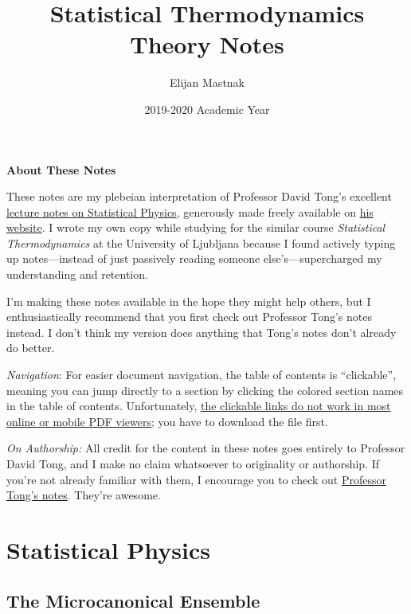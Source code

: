 \documentclass[11pt, a4paper]{article}
\begin{document}
\title{Statistical Thermodynamics Theory Notes}
\author{Elijan Mastnak}
\date{2019-2020 Academic Year}
\maketitle

\begin{center}
\textbf{About These Notes}
\end{center}
These notes are my plebeian interpretation of Professor David Tong's excellent \href{http://www.damtp.cam.ac.uk/user/tong/statphys.html}{lecture notes on Statistical Physics}, generously made freely available on \href{http://www.damtp.cam.ac.uk/user/tong/teaching.html}{his website}. I wrote my own copy while studying for the similar course \textit{Statistical Thermodynamics} at the University of Ljubljana because I found actively typing up notes---instead of just passively reading someone else's---supercharged my understanding and retention. 

I'm making these notes available in the hope they might help others, but I enthusiastically recommend that you first check out Professor Tong's notes instead. I don't think my version does anything that Tong's notes don't already do better.

\vspace{2mm}
\textit{Navigation}: For easier document navigation, the table of contents is ``clickable'', meaning you can jump directly to a section by clicking the colored section names in the table of contents. Unfortunately, \uline{the clickable links do not work in most online or mobile PDF viewers}; you have to download the file first.

\vspace{2mm}
\textit{On Authorship:} All credit for the content in these notes goes entirely to Professor David Tong, and I make no claim whatsoever to originality or authorship. If you're not already familiar with them, I encourage you to check out \href{http://www.damtp.cam.ac.uk/user/tong/teaching.html}{Professor Tong's notes}. They're awesome.


\tableofcontents

\newpage

\section{Statistical Physics}

\subsection{The Microcanonical Ensemble}
\end{document}
